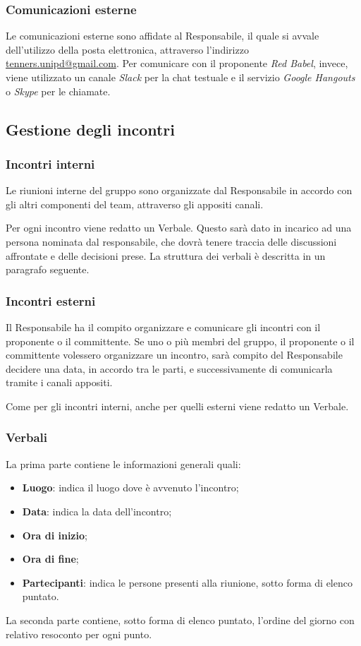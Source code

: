 		\subsubsection{Comunicazioni esterne}
		Le comunicazioni esterne sono affidate al Responsabile, il quale si avvale dell'utilizzo della posta elettronica, attraverso l'indirizzo \href{mailto:tenners.unipd@gmail.com}{tenners.unipd@gmail.com}.
		Per comunicare con il proponente \textit{Red Babel}, invece, viene utilizzato un canale \textit{Slack\glo} per la chat testuale e il servizio \textit{Google Hangouts\glos} o \textit{Skype\glo} per le chiamate. 
		
	\subsection{Gestione degli incontri}
		\subsubsection{Incontri interni}
		Le riunioni interne del gruppo sono organizzate dal Responsabile in accordo con gli altri componenti del team, attraverso gli appositi canali.
		
		\noindent Per ogni incontro viene redatto un Verbale. Questo sarà dato in incarico ad una persona nominata dal responsabile, che dovrà tenere traccia delle discussioni affrontate e delle decisioni prese. La struttura dei verbali è descritta in un paragrafo seguente.
		
		\subsubsection{Incontri esterni}
		Il Responsabile ha il compito organizzare e comunicare gli incontri con il proponente o il committente. Se uno o più membri del gruppo, il proponente o il committente volessero organizzare un incontro, sarà compito del Responsabile decidere una data, in accordo tra le parti, e successivamente di comunicarla tramite i canali appositi.
		
		\noindent Come per gli incontri interni, anche per quelli esterni viene redatto un Verbale.
		\subsubsection{Verbali}
		La prima parte contiene le informazioni generali quali:
		\begin{itemize}
			\item \textbf{Luogo}: indica il luogo dove è avvenuto l'incontro;
			\item \textbf{Data}: indica la data dell'incontro;
			\item \textbf{Ora di inizio};
			\item \textbf{Ora di fine};
			\item \textbf{Partecipanti}: indica le persone presenti alla riunione, sotto forma di elenco puntato.
		\end{itemize}
		La seconda parte contiene, sotto forma di elenco puntato, l'ordine del giorno con relativo resoconto per ogni punto.
		
